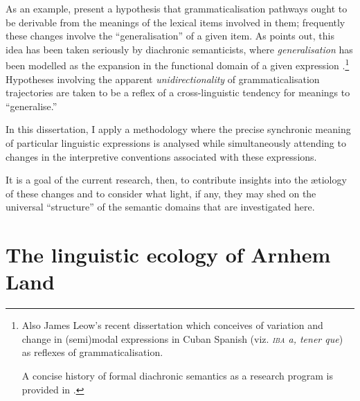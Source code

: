 \documentclass[12pt,dvipsnames]{report}
\begin{document}
As an example, \citet{Bybee1994} present a hypothesis that grammaticalisation pathways ought to be derivable from the meanings of the lexical items involved in them; frequently these changes involve the ``generalisation'' of a given item. As \citet[7]{Leow2020} points out, this idea has been taken seriously by diachronic semanticists, where \textit{generalisation} has been modelled as the expansion in the functional domain of a given expression \citep[\textit{e.g.},][]{Deo2015a,Condoravdi2014}.\footnote{Also James Leow's recent \citeyearpar{Leow2020} dissertation which conceives of variation and change in (semi)modal expressions in Cuban Spanish (viz. \textit{\textsc{iba} a, tener que}) as reflexes of grammaticalisation.

A concise history of formal diachronic semantics as a research program is provided in \citet{Yanovich2020}.} 
 Hypotheses involving the apparent \textit{unidirectionality} of grammaticalisation trajectories are taken to be a reflex of a cross-linguistic tendency for meanings to ``generalise.''

 In this dissertation, I apply a methodology where the precise synchronic meaning of particular linguistic expressions is analysed while simultaneously attending to changes in the interpretive conventions associated with these expressions.
 
 It is a goal of the current research, then, to contribute insights into the ætiology of these changes and to consider what light, if any, they may shed on the universal ``structure'' of the semantic domains that are investigated here.

\section{The linguistic ecology of Arnhem Land}\label{sec:ecol}
\end{document}

